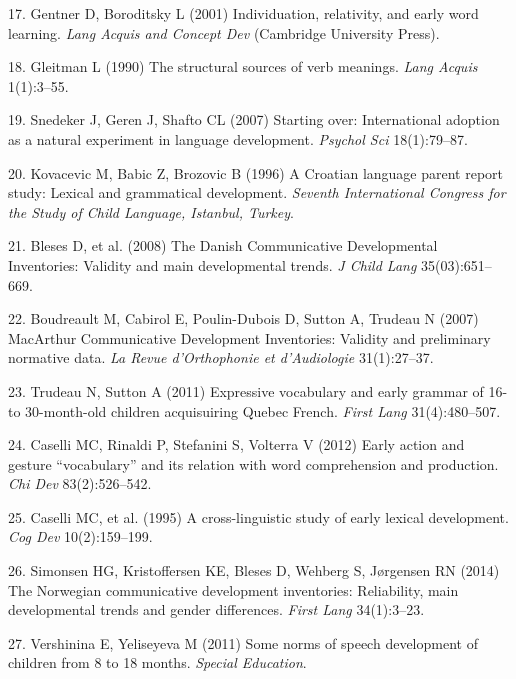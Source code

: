 \documentclass[english,man]{apa6}
\theoremstyle{definition}
\theoremstyle{definition}
\theoremstyle{definition}
\theoremstyle{remark}
\begin{document}
\hypertarget{ref-gentner2001}{}
17. Gentner D, Boroditsky L (2001) Individuation, relativity, and early
word learning. \emph{Lang Acquis and Concept Dev} (Cambridge University
Press).

\hypertarget{ref-gleitman1990}{}
18. Gleitman L (1990) The structural sources of verb meanings.
\emph{Lang Acquis} 1(1):3--55.

\hypertarget{ref-snedeker2007}{}
19. Snedeker J, Geren J, Shafto CL (2007) Starting over: International
adoption as a natural experiment in language development. \emph{Psychol
Sci} 18(1):79--87.

\hypertarget{ref-kovacevic1996}{}
20. Kovacevic M, Babic Z, Brozovic B (1996) A Croatian language parent
report study: Lexical and grammatical development. \emph{Seventh
International Congress for the Study of Child Language, Istanbul,
Turkey}.

\hypertarget{ref-bleses2008}{}
21. Bleses D, et al. (2008) The Danish Communicative Developmental
Inventories: Validity and main developmental trends. \emph{J Child Lang}
35(03):651--669.

\hypertarget{ref-boudreault2007}{}
22. Boudreault M, Cabirol E, Poulin-Dubois D, Sutton A, Trudeau N (2007)
MacArthur Communicative Development Inventories: Validity and
preliminary normative data. \emph{La Revue d'Orthophonie et
d'Audiologie} 31(1):27--37.

\hypertarget{ref-trudeau2011}{}
23. Trudeau N, Sutton A (2011) Expressive vocabulary and early grammar
of 16-to 30-month-old children acquisuiring Quebec French. \emph{First
Lang} 31(4):480--507.

\hypertarget{ref-caselli2012}{}
24. Caselli MC, Rinaldi P, Stefanini S, Volterra V (2012) Early action
and gesture ``vocabulary'' and its relation with word comprehension and
production. \emph{Chi Dev} 83(2):526--542.

\hypertarget{ref-caselli1995}{}
25. Caselli MC, et al. (1995) A cross-linguistic study of early lexical
development. \emph{Cog Dev} 10(2):159--199.

\hypertarget{ref-simonsen2014}{}
26. Simonsen HG, Kristoffersen KE, Bleses D, Wehberg S, Jørgensen RN
(2014) The Norwegian communicative development inventories: Reliability,
main developmental trends and gender differences. \emph{First Lang}
34(1):3--23.

\hypertarget{ref-vershinina2011}{}
27. Vershinina E, Yeliseyeva M (2011) Some norms of speech development
of children from 8 to 18 months. \emph{Special Education}.
\end{document}
